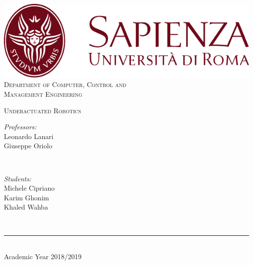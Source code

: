 \begin{titlepage}
	\centering
    \vspace*{0.5 cm}
    \includegraphics[scale = 0.75]{figures/SapienzaLogo.pdf}\\[1.0 cm]	%

    \vspace*{-0.4cm}
    \textsc{\large Department of Computer, Control and\\Management Engineering}\\[2.0 cm]	%
    \vspace*{1cm}

    { \fontsize{20.74pt}{18.5pt}\selectfont\bfseries \thetitle \par } %

    \vspace*{0.25cm}
    \textsc{\Large Underactuated Robotics}\\[0.5 cm] %

    \vspace*{2.6cm}
	\begin{minipage}{0.4\textwidth} %
		\begin{flushleft} \large
			\emph{Professors:}\\
			Leonardo Lanari\\
      Giuseppe Oriolo\\
		\end{flushleft}
	\end{minipage}~
	\begin{minipage}{0.25\textwidth} %
		\begin{flushright} \large
		\begin{minipage}{1\textwidth}
		\begin{flushleft} \large
			\emph{Students:} \\
			Michele Cipriano\\
            Karim Ghonim\\
            Khaled Wahba\\
            \vspace*{0.2cm}
        \end{flushleft}
        \end{minipage}
		\end{flushright}
	\end{minipage}\\[3.85 cm]

    \vspace{0.2cm}
    \rule{\linewidth}{0.2 mm} \\[0.3 cm]
    \vspace*{-0.3cm}
    Academic Year 2018/2019
\end{titlepage}